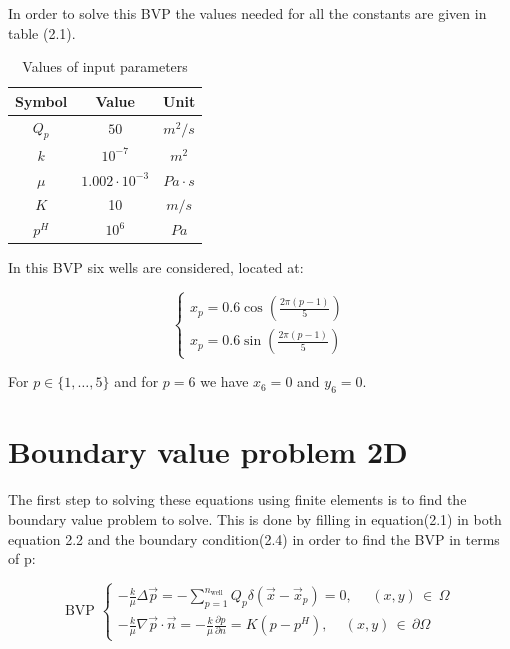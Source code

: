 \documentclass[a4paper]{report}
\begin{document}
In order to solve this BVP the values needed for all the constants are given in table (2.1).


\begin{table}[h]
	\caption{Values of input parameters} %
	\centering %
	\begin{tabular}{c c c} %
		\hline\hline %
		Symbol & Value & Unit\\ [0.5ex] %
		\hline %
		$Q_p$ & $50$ & $m^2/s$ \\ %
		$k$ & $10^{-7}$ & $m^2$ \\
		$\mu$ & $1.002\cdot 10^{-3}$ & $Pa\cdot s$ \\
		$K$ & 10 & $m/s$ \\
		$p^H$ & $10^6$ & $Pa$ \\ [1ex] %
		\hline %
	\end{tabular}
	\label{table:nonlin} %
\end{table}
\bigskip

In this BVP six wells are considered, located at:


\begin{equation}
	\begin{cases} 
		x_p=0.6\cos(\frac{2\pi (p-1)}{5}) \\ x_p=0.6\sin(\frac{2\pi (p-1)}{5})
	\end{cases} 
\end{equation}

For $ p \in \{1, \dots ,5\}$ and for $p = 6$ we have $ x_6 = 0 $ and $ y_6 = 0 $.

\section{Boundary value problem 2D}
The first step to solving these equations using finite elements is to find the boundary value problem to solve. This is done by filling in equation(2.1) in both equation 2.2 and the boundary condition(2.4) in order to find the BVP in terms of p:
\vspace{5mm}


\begin{equation}
\text{BVP  }
	\begin{cases}
		-\frac{k}{\mu}\Delta\vec{p}=-\sum\limits_{p=1}^{n_{\text{well}}}Q_p\delta(\vec{x}-\vec{x}_p)=0,\, \, \quad (x,y) \, \in \, \Omega\\
		-\frac{k}{\mu}\nabla\vec{p}\cdot\vec{n}=-\frac{k}{\mu}\frac{\partial p}{\partial n} =K(p-p^H), \, \quad (x,y)\,  \in  \, \partial\Omega
	\end{cases}
\end{equation}
\end{document}
